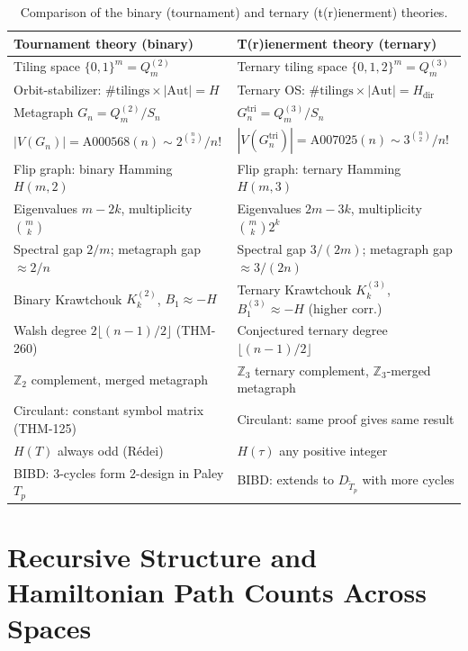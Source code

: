 \documentclass[12pt,reqno]{amsart}
\theoremstyle{definition}
\theoremstyle{plain}
\begin{document}
\begin{table}[ht]
\centering
\caption{Comparison of the binary (tournament) and ternary (t(r)ienerment) theories.}
\label{tab:comparison}
\begin{tabular}{p{5.2cm}p{5.2cm}}
\toprule
\textbf{Tournament theory (binary)} & \textbf{T(r)ienerment theory (ternary)}\\
\midrule
Tiling space $\{0,1\}^m=Q_m^{(2)}$ & Ternary tiling space $\{0,1,2\}^m=Q_m^{(3)}$\\
Orbit-stabilizer: $\#\text{tilings}\times|\mathrm{Aut}|=H$ & Ternary OS: $\#\text{tilings}\times|\mathrm{Aut}|=H_{\mathrm{dir}}$\\
Metagraph $G_n=Q_m^{(2)}/S_n$ & $G_n^{\mathrm{tri}}=Q_m^{(3)}/S_n$\\
$|V(G_n)|=\mathrm{A000568}(n)\sim 2^{\binom{n}{2}}/n!$ & $|V(G_n^{\mathrm{tri}})|=\mathrm{A007025}(n)\sim 3^{\binom{n}{2}}/n!$\\
Flip graph: binary Hamming $H(m,2)$ & Flip graph: ternary Hamming $H(m,3)$\\
Eigenvalues $m-2k$, multiplicity $\binom{m}{k}$ & Eigenvalues $2m-3k$, multiplicity $\binom{m}{k}2^k$\\
Spectral gap $2/m$; metagraph gap $\approx 2/n$ & Spectral gap $3/(2m)$; metagraph gap $\approx 3/(2n)$\\
Binary Krawtchouk $K_k^{(2)}$, $B_1\approx -H$ & Ternary Krawtchouk $K_k^{(3)}$, $B_1^{(3)}\approx -H$ (higher corr.)\\
Walsh degree $2\lfloor(n{-}1)/2\rfloor$ (THM-260) & Conjectured ternary degree $\lfloor(n{-}1)/2\rfloor$\\
$\mathbb{Z}_2$ complement, merged metagraph & $\mathbb{Z}_3$ ternary complement, $\mathbb{Z}_3$-merged metagraph\\
Circulant: constant symbol matrix (THM-125) & Circulant: same proof gives same result\\
$H(T)$ always odd (R\'edei) & $H(\tau)$ any positive integer\\
BIBD: 3-cycles form $2$-design in Paley $T_p$ & BIBD: extends to $D_{\tilde{T}_p}$ with more cycles\\
\bottomrule
\end{tabular}
\end{table}

\section{Recursive Structure and Hamiltonian Path Counts Across Spaces}
\label{sec:recursive}
\end{document}
